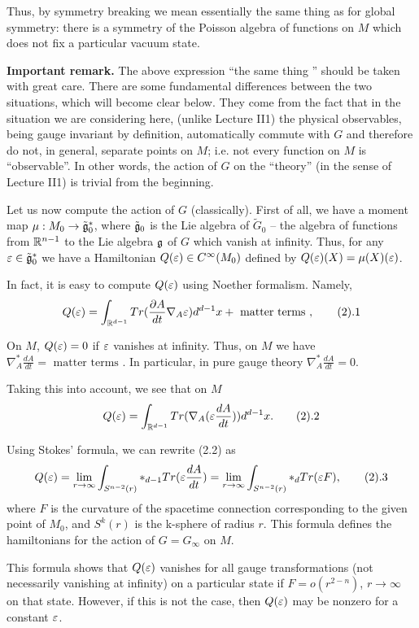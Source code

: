 Thus, by symmetry breaking we mean essentially the same thing as for 
global symmetry: there is a 
symmetry of the Poisson algebra of functions on $M$ which 
does not fix a particular vacuum state. 

{\bf Important remark.} The above expression ``the same thing ''
should be taken with great care. There are some fundamental differences 
between the two situations, which will become clear below. 
They come from the fact that in the situation we are considering here, 
(unlike Lecture II1) the physical observables, being gauge invariant 
by definition, automatically commute with $G$ and therefore do not, in 
general, separate points on $M$; i.e. not every function on $M$ is 
``observable''. In other words, the action of 
$G$ on the ``theory'' (in the sense of Lecture II1) is trivial 
from the beginning. 
 
Let us now compute the action of $G$ (classically).  
First of all, we have a moment map $\mu:M_0\to \tilde {\frak g}_0^*$, where 
$\tilde{\frak g}_0$ is the Lie algebra of $\tilde G_0$ -- the algebra of 
functions from $\Bbb R^{n-1}$ to the Lie algebra $\frak g$ of $G$ which vanish at 
infinity. Thus, for any $\varepsilon\in \tilde{\frak g}_0^*$ we have a Hamiltonian 
$Q(\varepsilon)\in C^\infty(M_0)$ defined by $Q(\varepsilon)(X)=\mu(X)(\varepsilon)$. 

In fact, it is easy to compute $Q(\varepsilon)$ using Noether formalism. Namely, 
$$
Q(\e)=\int_{\R^{d-1}}Tr(\frac{\d A}{dt}\nabla_A \e)d^{d-1}x+
\text{ matter terms },\tag 2.1
$$

On $M$, $Q(\varepsilon)=0$ if $\varepsilon$ vanishes at infinity. Thus, on $M$ we have 
$\nabla_A^*\frac{dA}{dt}=
\text{ matter terms }$. In particular, in pure gauge theory 
$\nabla_A^*\frac{dA}{dt}=0$. 

Taking this into account, we see that on $M$ 
$$
Q(\e)=\int_{\R^{d-1}}Tr(\nabla_A (\e\frac{dA}{dt}))d^{d-1}x.\tag 2.2
$$

Using Stokes' formula, we can rewrite (2.2) as   
$$
Q(\e)=\lim_{r\to\infty}\int_{S^{n-2}(r)}
*_{d-1}Tr(\e\frac{dA}{dt})=\lim_{r\to\infty}
\int_{S^{n-2}(r)}*_dTr(\e F), \tag 2.3
$$
where $F$ is the curvature of the spacetime connection
corresponding to the given point of $M_0$, and $S^k(r)$ is the k-sphere of 
radius $r$. This formula defines the hamiltonians 
for the action of $G=G_\infty$ on $M$. 

This formula shows that $Q(\varepsilon)$ vanishes for all gauge transformations 
(not necessarily vanishing at infinity) on a particular state 
if $F=o(r^{2-n})$, $r\to\infty$ on that state. However, if 
this is not the case, then $Q(\varepsilon)$ may be nonzero for a constant $\varepsilon$.  


